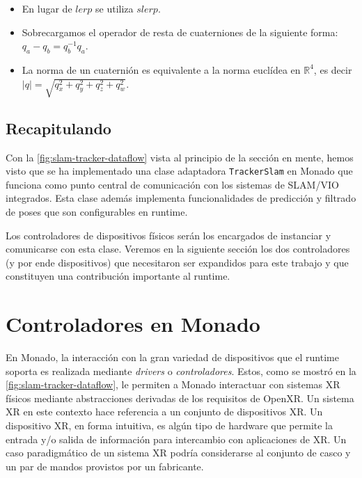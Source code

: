 \documentclass[ twoside,openright,titlepage,numbers=noenddot,%
                headinclude,footinclude,cleardoublepage=empty,abstract=on,
                BCOR=-5mm,paper=a4,fontsize=11pt
                ]{scrreprt}
\newcommand{\R}{\mathbb{R}}
\newcommand{\passthrough}[1]{#1}
\newcommand{\figref}{\autoref}
\begin{document}
\bigbreak

\begin{itemize}
\item
  En lugar de \(lerp\) se utiliza \(slerp\).
\item
  Sobrecargamos el operador de resta de cuaterniones de la siguiente
  forma: \(q_a - q_b = q_b^{-1} q_a\).
\item
  La norma de un cuaternión es equivalente a la norma euclídea en
  \(\R^4\), es decir \(|q| = \sqrt{q_x^2 + q_y^2 + q_z^2 + q_w^2}\).
\end{itemize}

\bigbreak

\hypertarget{recapitulando}{%
\section{Recapitulando}\label{recapitulando}}

Con la \figref{fig:slam-tracker-dataflow} vista al principio de la
sección en mente, hemos visto que se ha implementado una clase
adaptadora \passthrough{\lstinline!TrackerSlam!} en Monado que funciona
como punto central de comunicación con los sistemas de SLAM/VIO
integrados. Esta clase además implementa funcionalidades de predicción y
filtrado de poses que son configurables en runtime.

Los controladores de dispositivos físicos serán los encargados de
instanciar y comunicarse con esta clase. Veremos en la siguiente sección
los dos controladores (y por ende dispositivos) que necesitaron ser
expandidos para este trabajo y que constituyen una contribución
importante al runtime.

\hypertarget{drivers}{%
\chapter{Controladores en Monado}\label{drivers}}

En Monado, la interacción con la gran variedad de dispositivos que el
runtime soporta es realizada mediante \emph{drivers} o
\emph{controladores}. Estos, como se mostró en la
\figref{fig:slam-tracker-dataflow}, le permiten a Monado interactuar con
sistemas XR físicos mediante abstracciones derivadas de los requisitos
de OpenXR. Un sistema XR en este contexto hace referencia a un conjunto
de dispositivos XR. Un dispositivo XR, en forma intuitiva, es algún tipo
de hardware que permite la entrada y/o salida de información para
intercambio con aplicaciones de XR. Un caso paradigmático de un sistema
XR podría considerarse al conjunto de casco y un par de mandos provistos
por un fabricante.
\end{document}
